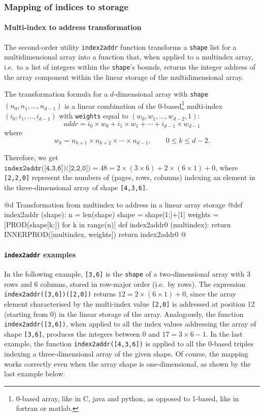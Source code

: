 \documentclass[11pt,oneside]{article}	%
\begin{document}
\subsubsection{Mapping of indices to storage}

\paragraph{Multi-index to address transformation}
The second-order utility \texttt{index2addr} function transforms a \texttt{shape} list for a multidimensional array into a function that, when applied to a multindex array, i.e.~to a list of integers within the \texttt{shape}'s bounds, returns the integer address of the array component within the linear storage of the multidimensional array.

The transformation formula for a $d$-dimensional array with \texttt{shape} $(n_0,n_1,...,n_{d-1})$ is a linear combination of the 0-based\footnote{0-based array, like in C, java and python, as opposed to 1-based, like in fortran or matlab.} multi-index $(i_0,i_1,...,i_{d-1})$ with \texttt{weights} equal to $(w_0,w_1,...,w_{d-2},1)$:
\[
addr = i_0\times w_0 +i_1\times w_1 +\cdots +i_{d-1}\times w_{d-1}
\]
where 
\[
w_k = n_{k+1} \times n_{k+2} \times\cdots\times  n_{d-1}, \qquad 0\leq k\leq d-2.
\]

Therefore, we get $\texttt{index2addr([4,3,6])([2,2,0])}=48= 2\times(3\times 6)+2\times(6\times 1)+0$,
where \texttt{[2,2,0]} represent the numbers of (pages, rows, columns) indexing an element in the three-dimensional array of shape \texttt{[4,3,6]}.

@d Transformation from multindex to address in a linear array storage
@{def index2addr (shape):
    n = len(shape)
    shape = shape[1:]+[1]
    weights = [PROD(shape[k:]) for k in range(n)]
    def index2addr0 (multindex):
        return INNERPROD([multindex, weights])
    return index2addr0
@}

\paragraph{\texttt{index2addr} examples}
In the following example, \texttt{[3,6]} is the \texttt{shape} of a two-dimen\-sion\-al array with 3 rows and 6 columns, stored in row-major order (i.e.~by rows). The expression \texttt{index2addr([3,6])([2,0])} returns $12=2\times(6\times 1)+0$, since the array element characterised by the multi-index value \texttt{[2,0]} is addressed at position 12 (starting from 0) in the linear storage of the array. Analogously, the function \texttt{index2addr([3,6])}, when applied to all the index values addressing the array of shape \texttt{[3,6]}, produces the integers between 0 and $17 = 3\times 6 -1$. In the last example, the function \texttt{index2addr([4,3,6])} is applied to all the 0-based triples indexing a three-dimensional array of the given shape. Of course, the mapping works correctly even when the array shape is one-dimensional, as shown by the last example below.
\end{document}
